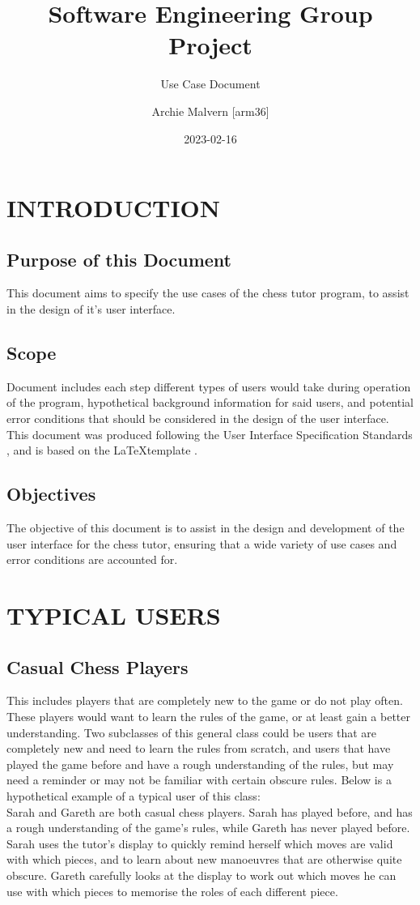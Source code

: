\documentclass{project}
\begin{document}
\title{Software Engineering Group Project}
\subtitle{Use Case Document}
\author{Archie Malvern [arm36]}
\date{2023-02-16}
\maketitle
\tableofcontents
\newpage
\section{INTRODUCTION}
\subsection{Purpose of this Document}
This document aims to specify the use cases of the chess tutor program, to assist in the design of it’s user interface.
\subsection{Scope}
Document includes each step different types of users would take during operation of the program, hypothetical background information for said users, and potential error conditions that should be considered in the design of the user interface.
This document was produced following the User Interface Specification Standards \cite{se.qa.04}, and is based on the \LaTeX template \cite{SE-N66-TEST}.
\subsection{Objectives}
The objective of this document is to assist in the design and development of the user interface for the chess tutor, ensuring that a wide variety of use cases and error conditions are accounted for.
\section{TYPICAL USERS}
\subsection{Casual Chess Players}
This includes players that are completely new to the game or do not play often. These players would want to learn the rules of the game, or at least gain a better understanding. Two subclasses of this general class could be users that are completely new and need to learn the rules from scratch, and users that have played the game before and have a rough understanding of the rules, but may need a reminder or may not be familiar with certain obscure rules. Below is a hypothetical example of a typical user of this class:\\
Sarah and Gareth are both casual chess players. Sarah has played before, and has a rough understanding of the game’s rules, while Gareth has never played before. Sarah uses the tutor’s display to quickly remind herself which moves are valid with which pieces, and to learn about new manoeuvres that are otherwise quite obscure. Gareth carefully looks at the display to work out which moves he can use with which pieces to memorise the roles of each different piece.
\end{document}
